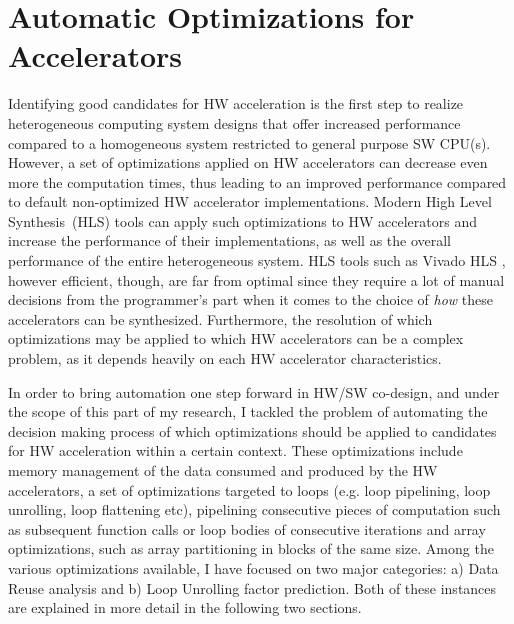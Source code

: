 \documentclass[]{usiinfthesis}
\newcommand{\HLS}{{High Level Synthesis}}
\begin{document}



%
%
%
%
%  
%
%
%
%
%

\chapter{Automatic Optimizations for Accelerators}

Identifying good candidates for HW acceleration is the first step to realize heterogeneous
computing system designs that offer increased performance compared to a homogeneous system restricted
to general purpose SW CPU(s). However, a set of optimizations applied on HW accelerators can decrease 
even more the computation times, thus leading to an improved performance compared to default
non-optimized HW accelerator implementations. 
Modern \HLS\ (HLS) tools can apply such optimizations to 
HW accelerators and increase the performance of their implementations, as well as the overall performance 
of the entire heterogeneous system.
HLS tools such as Vivado HLS  \cite{VivadoHLSMar17}, however efficient, though, are far from 
optimal since they require a lot of manual decisions from the programmer's part when it comes to the
choice of {\em how} these accelerators can be synthesized.
Furthermore, the resolution of which optimizations may be applied to which HW accelerators can be a 
complex problem, as it depends heavily on each HW accelerator characteristics.\par

In order to bring automation one step forward in HW/SW co-design, and under the scope of this part of my 
research, I tackled the problem of automating the decision making process of which optimizations should be 
applied to candidates for HW acceleration within a certain context. 
These optimizations include memory management of the data consumed and produced by the HW accelerators, 
a set of optimizations targeted to loops (e.g. loop pipelining, loop unrolling, loop flattening etc), 
pipelining consecutive pieces of computation such as subsequent function calls or loop bodies of consecutive 
iterations and array optimizations, such as array partitioning in blocks of the same size. Among the various 
optimizations available, I have focused on two major categories: a) Data Reuse analysis and b) Loop Unrolling 
factor prediction. Both of these instances are explained in more detail in the following two sections.
\end{document}
